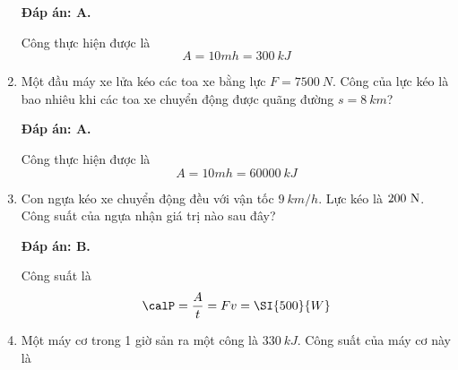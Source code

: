 \begin{enumerate}[label=\bfseries Câu \arabic*:]
{	}
	
	\loigiai
	{\textbf{Đáp án: A.}
		
		Công thực hiện được là
		$$A=10mh=\SI{300}{kJ}$$
	}
	\item {}
	
	\cauhoi
	{Một đầu máy xe lửa kéo các toa xe bằng lực $F=\SI{7500}{N}$. Công của lực kéo là bao nhiêu khi các toa xe chuyển động được quãng đường $s=\SI{8}{km}$?
		
		
	}
	
	\loigiai
	{\textbf{Đáp án: A.}
		
	Công thực hiện được là
	$$A=10mh=\SI{60000}{kJ}$$
	}
	\item {}
	
	\cauhoi
	{Con ngựa kéo xe chuyển động đều với vận tốc $\SI{9}{km/h}$. Lực kéo là $200\ \text N$. Công suất của ngựa nhận giá trị nào sau đây?
		
		
	}
	
	\loigiai
	{\textbf{Đáp án: B.}
		
	Công suất là
	$$\calP = \dfrac{A}{t} = Fv=\SI{500}{W}$$
	}
	\item {}
	
	\cauhoi
	{Một máy cơ trong 1 giờ sản ra một công là $\SI{330}{kJ}$. Công suất của máy cơ này là
		
		
	}
	

\end{enumerate}
